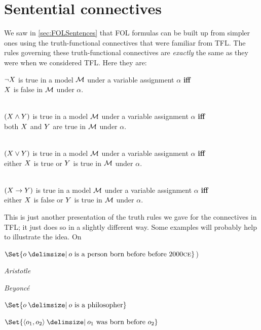 \section{Sentential connectives}
We saw in \cref{sec:FOLSentences} that FOL formulas can be built up from simpler ones using the truth-functional connectives that were familiar from TFL. The rules governing these truth-functional connectives are \emph{exactly} the same as they were when we considered TFL. Here they are:
\begin{definition}
	$\neg X$ is true in a model ${\mathcal{M}}$ under a variable assignment $\alpha$ \textbf{iff} \\$X$ is false in ${\mathcal{M}}$ under $\alpha$.
	
	\
	\\$(X \mathbin{\wedge} Y)$ is true in a model ${\mathcal{M}}$ under a variable assignment $\alpha$ \textbf{iff}\\ both $X$ and $Y$ are true in ${\mathcal{M}}$ under $\alpha$.
	
	\
	\\
	$(X \vee Y)$ is true in a model ${\mathcal{M}}$ under a variable assignment $\alpha$ \textbf{iff}\\ either $X$ is true or $Y$ is true in ${\mathcal{M}}$ under $\alpha$.
	
	\
	\\$(X \rightarrow Y)$ is true in a model ${\mathcal{M}}$ under a variable assignment $\alpha$ \textbf{iff}\\ either $X$ is false or $Y$ is true in ${\mathcal{M}}$ under $\alpha$.
	
\end{definition}
This is just another presentation of the truth rules we gave for the connectives in TFL; it just does so in a slightly different way. Some examples will probably help to illustrate the idea. On 	\begin{interp}
	\item[\domain]$\Set{o \given o\text{ is a person born before before 2000\textsc{ce}}}$)
	\item[\denote{a}] \emph{Aristotle}
	\item[\denote{b}] \emph{Beyonc\'e}
	\item[\denote{P}] $\Set{o \given o\text{ is a philosopher}}$
	\item[\denote{R}] $\Set{\langle o_1,o_2\rangle \given o_1\text{ was born before }o_2}$
\end{interp}
